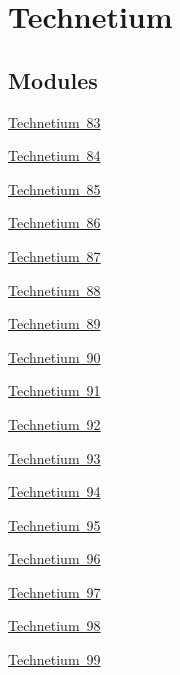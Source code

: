 \hypertarget{group___isotope_const-_technetium}{}\section{Technetium}
\label{group___isotope_const-_technetium}
\subsection*{Modules}
\begin{DoxyCompactItemize}
\item 
\mbox{\hyperlink{group___isotope_const-_technetium-_tc83}{Technetium 83}}
\item 
\mbox{\hyperlink{group___isotope_const-_technetium-_tc84}{Technetium 84}}
\item 
\mbox{\hyperlink{group___isotope_const-_technetium-_tc85}{Technetium 85}}
\item 
\mbox{\hyperlink{group___isotope_const-_technetium-_tc86}{Technetium 86}}
\item 
\mbox{\hyperlink{group___isotope_const-_technetium-_tc87}{Technetium 87}}
\item 
\mbox{\hyperlink{group___isotope_const-_technetium-_tc88}{Technetium 88}}
\item 
\mbox{\hyperlink{group___isotope_const-_technetium-_tc89}{Technetium 89}}
\item 
\mbox{\hyperlink{group___isotope_const-_technetium-_tc90}{Technetium 90}}
\item 
\mbox{\hyperlink{group___isotope_const-_technetium-_tc91}{Technetium 91}}
\item 
\mbox{\hyperlink{group___isotope_const-_technetium-_tc92}{Technetium 92}}
\item 
\mbox{\hyperlink{group___isotope_const-_technetium-_tc93}{Technetium 93}}
\item 
\mbox{\hyperlink{group___isotope_const-_technetium-_tc94}{Technetium 94}}
\item 
\mbox{\hyperlink{group___isotope_const-_technetium-_tc95}{Technetium 95}}
\item 
\mbox{\hyperlink{group___isotope_const-_technetium-_tc96}{Technetium 96}}
\item 
\mbox{\hyperlink{group___isotope_const-_technetium-_tc97}{Technetium 97}}
\item 
\mbox{\hyperlink{group___isotope_const-_technetium-_tc98}{Technetium 98}}
\item 
\mbox{\hyperlink{group___isotope_const-_technetium-_tc99}{Technetium 99}}

\end{DoxyCompactItemize}
